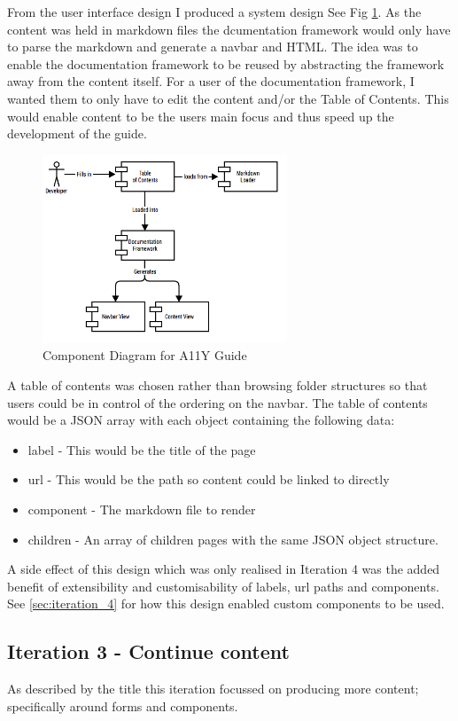 From the user interface design I produced a system design See Fig
\ref{fig:allycomponent}. As the content was held in markdown files the
dcumentation framework would only have to parse the markdown and generate a
navbar and HTML. The idea was to enable the documentation framework
to be reused by abstracting the framework away from the content itself. For a
user of the documentation framework, I wanted them to only have to edit the
content and/or the Table of Contents. This would enable content to be the
users main focus and thus speed up the development of the guide.
\begin{figure}[H]
\centering
\includegraphics[width=0.65\textwidth]{figures/documentation_design}
\captionsetup{justification=centering}
\caption[Short figure name.]{Component Diagram for A11Y Guide
\label{fig:allycomponent}}
\end{figure}
A table of contents was
chosen rather than browsing folder structures so that users
could be in control of the ordering on the navbar. The table of contents
would be a JSON array with each object containing the following data:
\begin{itemize}
\item label - This would be the title of the page
\item url - This would be the path so content could be linked to directly
\item component - The markdown file to render
\item children - An array of children pages with the same JSON object structure.
\end{itemize}
A side effect of this design which was only realised in Iteration 4 was the
added benefit of extensibility and customisability of labels, url paths and
components. See \ref{sec:iteration_4} for how this design enabled custom
components to be used.

\subsection{Iteration 3 - Continue content}
As described by the title this iteration focussed on producing more content;
specifically around forms and components.

